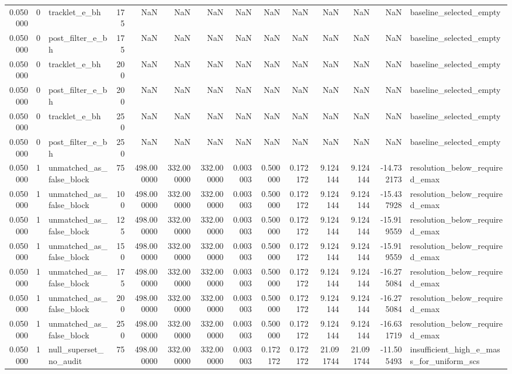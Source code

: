 \begin{tabular}{rrlrrrrrrrrrrl}
0.050000 & 0 & tracklet_e_bh & 175 & NaN & NaN & NaN & NaN & NaN & NaN & NaN & NaN & NaN & baseline_selected_empty \\
0.050000 & 0 & post_filter_e_bh & 175 & NaN & NaN & NaN & NaN & NaN & NaN & NaN & NaN & NaN & baseline_selected_empty \\
0.050000 & 0 & tracklet_e_bh & 200 & NaN & NaN & NaN & NaN & NaN & NaN & NaN & NaN & NaN & baseline_selected_empty \\
0.050000 & 0 & post_filter_e_bh & 200 & NaN & NaN & NaN & NaN & NaN & NaN & NaN & NaN & NaN & baseline_selected_empty \\
0.050000 & 0 & tracklet_e_bh & 250 & NaN & NaN & NaN & NaN & NaN & NaN & NaN & NaN & NaN & baseline_selected_empty \\
0.050000 & 0 & post_filter_e_bh & 250 & NaN & NaN & NaN & NaN & NaN & NaN & NaN & NaN & NaN & baseline_selected_empty \\
0.050000 & 1 & unmatched_as_false_block & 75 & 498.000000 & 332.000000 & 332.000000 & 0.003003 & 0.500000 & 0.172172 & 9.124144 & 9.124144 & -14.732173 & resolution_below_required_emax \\
0.050000 & 1 & unmatched_as_false_block & 100 & 498.000000 & 332.000000 & 332.000000 & 0.003003 & 0.500000 & 0.172172 & 9.124144 & 9.124144 & -15.437928 & resolution_below_required_emax \\
0.050000 & 1 & unmatched_as_false_block & 125 & 498.000000 & 332.000000 & 332.000000 & 0.003003 & 0.500000 & 0.172172 & 9.124144 & 9.124144 & -15.919559 & resolution_below_required_emax \\
0.050000 & 1 & unmatched_as_false_block & 150 & 498.000000 & 332.000000 & 332.000000 & 0.003003 & 0.500000 & 0.172172 & 9.124144 & 9.124144 & -15.919559 & resolution_below_required_emax \\
0.050000 & 1 & unmatched_as_false_block & 175 & 498.000000 & 332.000000 & 332.000000 & 0.003003 & 0.500000 & 0.172172 & 9.124144 & 9.124144 & -16.275084 & resolution_below_required_emax \\
0.050000 & 1 & unmatched_as_false_block & 200 & 498.000000 & 332.000000 & 332.000000 & 0.003003 & 0.500000 & 0.172172 & 9.124144 & 9.124144 & -16.275084 & resolution_below_required_emax \\
0.050000 & 1 & unmatched_as_false_block & 250 & 498.000000 & 332.000000 & 332.000000 & 0.003003 & 0.500000 & 0.172172 & 9.124144 & 9.124144 & -16.631719 & resolution_below_required_emax \\
0.050000 & 1 & null_superset_no_audit & 75 & 498.000000 & 332.000000 & 332.000000 & 0.003003 & 0.172172 & 0.172172 & 21.091744 & 21.091744 & -11.505493 & insufficient_high_e_mass_for_uniform_scs \\

\end{tabular}

